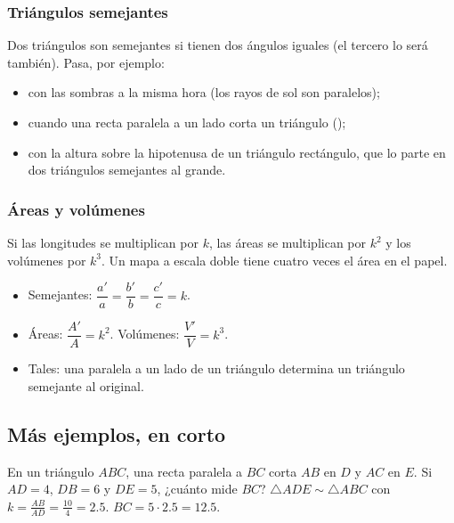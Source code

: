 \subsubsection{Triángulos semejantes}
Dos triángulos son semejantes si tienen dos ángulos iguales (el tercero lo será también). Pasa, por ejemplo:
\begin{itemize}
  \item con las sombras a la misma hora (los rayos de sol son paralelos);
  \item cuando una recta paralela a un lado corta un triángulo ();
  \item con la altura sobre la hipotenusa de un triángulo rectángulo, que lo parte en dos triángulos semejantes al grande.
\end{itemize}


\subsubsection{Áreas y volúmenes}
Si las longitudes se multiplican por $k$, las áreas se multiplican por $k^2$ y los volúmenes por $k^3$. Un mapa a escala
doble tiene cuatro veces el área en el papel.

\begin{regla}
\begin{itemize}
  \item Semejantes: $\dfrac{a'}{a} = \dfrac{b'}{b} = \dfrac{c'}{c} = k$.
  \item Áreas: $\dfrac{A'}{A} = k^2$. Volúmenes: $\dfrac{V'}{V} = k^3$.
  \item Tales: una paralela a un lado de un triángulo determina un triángulo semejante al original.
\end{itemize}
\end{regla}

\subsection{Más ejemplos, en corto}
\begin{ejemplo}[Tales]
En un triángulo $ABC$, una recta paralela a $BC$ corta $AB$ en $D$ y $AC$ en $E$. Si $AD = 4$, $DB = 6$ y $DE = 5$,
¿cuánto mide $BC$?
\solucion $\triangle ADE \sim \triangle ABC$ con $k = \tfrac{AB}{AD} = \tfrac{10}{4} = 2.5$. $BC = 5 \cdot 2.5 = 12.5$.
\end{ejemplo}

